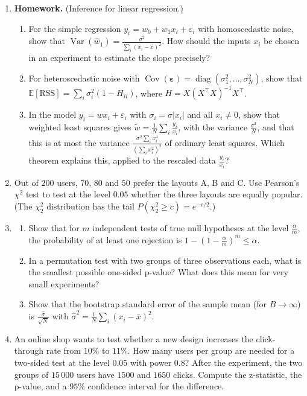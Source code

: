 \documentclass[11pt]{article}
\newcommand{\homework}{\textcolor{red!70!black}{\textbf{Homework.}}}
\newcommand{\E}{\mathbb{E}}
\DeclareMathOperator{\Var}{Var}
\DeclareMathOperator{\Cov}{Cov}
\theoremstyle{definition}
\theoremstyle{plain}
\theoremstyle{remark}
\DeclareMathOperator{\diag}{diag}
\begin{document}
\begin{enumerate}[leftmargin=*]
    \item \homework{} (Inference for linear regression.)
    \begin{enumerate}[label=(\alph*)]
        \item For the simple regression $y_i = w_0 + w_1x_i + \varepsilon_i$ with homoscedastic noise, show that $\Var(\hat w_1) = \frac{\sigma^2}{\sum_i (x_i - \bar x)^2}$. How should the inputs $x_i$ be chosen in an experiment to estimate the slope precisely?
        \item For heteroscedastic noise with $\Cov(\boldsymbol{\varepsilon}) = \diag(\sigma_1^2, \ldots, \sigma_N^2)$, show that $\E[\mathrm{RSS}] = \sum_i \sigma_i^2(1 - H_{ii})$, where $H = X(X^\top X)^{-1}X^\top$.
        \item In the model $y_i = wx_i + \varepsilon_i$ with $\sigma_i = \sigma|x_i|$ and all $x_i \neq 0$, show that weighted least squares gives $\tilde w = \frac{1}{N}\sum_i \frac{y_i}{x_i}$, with the variance $\frac{\sigma^2}{N}$, and that this is at most the variance $\frac{\sigma^2\sum_i x_i^4}{(\sum_i x_i^2)^2}$ of ordinary least squares. Which theorem explains this, applied to the rescaled data $\frac{y_i}{x_i}$?
    \end{enumerate}
    \item Out of $200$ users, $70$, $80$ and $50$ prefer the layouts A, B and C. Use Pearson's $\chi^2$ test to test at the level $0.05$ whether the three layouts are equally popular. (The $\chi^2_2$ distribution has the tail $P(\chi^2_2 \geq c) = e^{-c/2}$.)
    \item \begin{enumerate}[label=(\alph*)]
        \item Show that for $m$ independent tests of true null hypotheses at the level $\frac{\alpha}{m}$, the probability of at least one rejection is $1 - (1 - \frac{\alpha}{m})^m \leq \alpha$.
        \item In a permutation test with two groups of three observations each, what is the smallest possible one-sided p-value? What does this mean for very small experiments?
        \item Show that the bootstrap standard error of the sample mean (for $B \to \infty$) is $\frac{\hat\sigma}{\sqrt{N}}$ with $\hat\sigma^2 = \frac{1}{N}\sum_i (x_i - \bar x)^2$.
    \end{enumerate}
    \item An online shop wants to test whether a new design increases the click-through rate from $10\%$ to $11\%$. How many users per group are needed for a two-sided test at the level $0.05$ with power $0.8$? After the experiment, the two groups of $15\,000$ users have $1500$ and $1650$ clicks. Compute the z-statistic, the p-value, and a $95\%$ confidence interval for the difference.

\end{enumerate}
\end{document}
